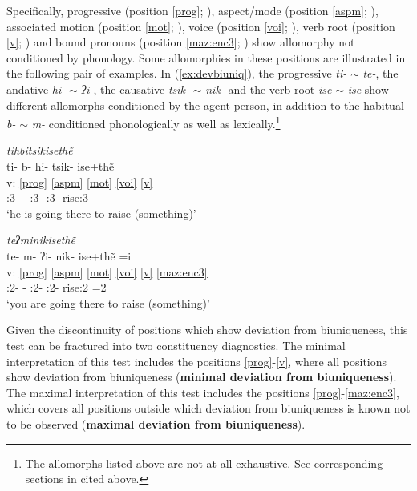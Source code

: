 \documentclass[output=paper]{langscibook}
\begin{document}
Specifically, progressive (position \ref{prog}; \citealt[50--52]{nakamoto20}), aspect/mode (position \ref{aspm}; \citealt[39--50, 288-306]{nakamoto20}), associated motion (position \ref{mot}; \citealt[52--53]{nakamoto20}), voice (position \ref{voi}; \citealt[29--30]{nakamoto20}), verb root (position \ref{v}; \citealt[270--288]{nakamoto20}) and bound pronouns (position \ref{maz:enc3}; \citealt[236--239]{nakamoto20}) show allomorphy not conditioned by phonology. Some allomorphies in these positions are illustrated in the following pair of examples. In (\ref{ex:devbiuniq}), the progressive \textit{ti\2\ff{}-} $\sim$ \textit{te\2-}, the andative \textit{hi\4-} $\sim$ \textit{ʔi\2-}, the causative \textit{tsi\2\ff{}k-} $\sim$ \textit{ni\2k-} and the verb root \textit{i\2se\3\ff} $\sim$ \textit{i\2se\4} show different allomorphs conditioned by the agent person, in addition to the habitual \textit{b-} $\sim$ \textit{m-} conditioned phonologically as well as lexically.\footnote{The allomorphs listed above are not at all exhaustive. See corresponding sections in \citet{nakamoto20} cited above.}

\ea \label{ex:devbiuniq}
 \ea \textit{ti\2hbi\4tsi\2ki\2se\2\st{}thẽ\4\1}\\
 \glll {} ti\2\ff{}- b- hi\4- tsi\2\ff{}k- i\2se\3\ff{}+thẽ\1\\
 v: \ref{prog} \ref{aspm} \ref{mot} \ref{voi} \ref{v}\\
 {} \Prog:3- \Hab- \Andt:3- \Caus:3- rise:3\\
 \glt `he is going there to raise (something)'

 \newpage
\ex \textit{te\2ʔmi\2ni\2ki\2se\4\st{}thẽ\1\3}\\
 \glll {} te\2- m- ʔi\2- ni\2k- i\2se\4+thẽ\1 =i\3\\
 v: \ref{prog} \ref{aspm} \ref{mot} \ref{voi} \ref{v} \ref{maz:enc3}\\
 {} \Prog:2- \Hab- \Andt:2- \Caus:2- rise:2 =2\Sg\\
 \glt `you are going there to raise (something)'
 \z
\z

Given the discontinuity of positions which show deviation from biuniqueness, this test can be fractured into two constituency diagnostics. The minimal interpretation of this test includes the positions \ref{prog}-\ref{v}, where all positions show deviation from biuniqueness (\textbf{minimal deviation from biuniqueness}). The maximal interpretation of this test includes the positions \ref{prog}-\ref{maz:enc3}, which covers all positions outside which  deviation from biuniqueness is known not to be observed (\textbf{maximal deviation from biuniqueness}).
\end{document}
